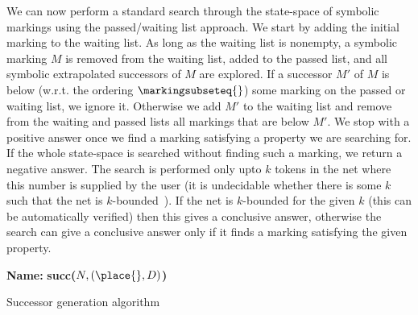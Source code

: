 We can now perform a standard search through the state-space of symbolic
markings using the passed/waiting list approach. We start by
adding the initial marking to the waiting list. As long as the waiting
list is nonempty, a symbolic marking $M$ is removed from the waiting list,
added to the passed list, and all symbolic extrapolated successors of $M$
are explored. If a successor $M'$ of $M$ is below (w.r.t. the
ordering $\markingsubseteq{}$) some marking on the passed or waiting
list, we ignore it. Otherwise we add $M'$ to the waiting list and
remove from the waiting and passed lists all markings that are below $M'$.
We stop with a positive answer once we find a marking satisfying a property
we are searching for.
If the whole state-space is searched without finding such a marking, we
return a negative answer.
The search is performed only upto $k$ tokens in the net where this
number is supplied by the user (it is undecidable whether
there is some $k$ such that the net is $k$-bounded~\cite{memics_paper}).
If the net is $k$-bounded for the given $k$ (this can be automatically
verified) then this gives
a conclusive answer, otherwise the search can give a conclusive
answer only if it finds a marking satisfying the given property.

\begin{algorithm}[p]
\textbf{Name: } \textbf{succ($N, (\place{},D)$)}\;
\caption{Successor generation algorithm\label{alg:simple_successor_generation}}  
\end{algorithm}

